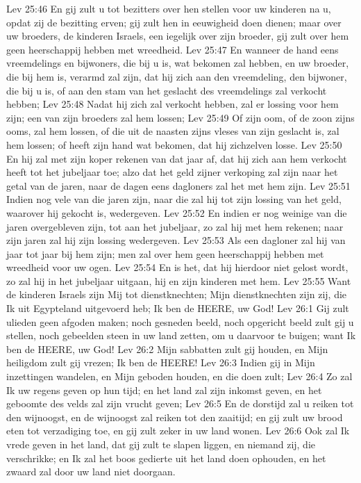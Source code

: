 Lev 25:46  En gij zult u tot bezitters over hen stellen voor uw kinderen na u, opdat zij de bezitting erven; gij zult hen in eeuwigheid doen dienen; maar over uw broeders, de kinderen Israels, een iegelijk over zijn broeder, gij zult over hem geen heerschappij hebben met wreedheid.
Lev 25:47  En wanneer de hand eens vreemdelings en bijwoners, die bij u is, wat bekomen zal hebben, en uw broeder, die bij hem is, verarmd zal zijn, dat hij zich aan den vreemdeling, den bijwoner, die bij u is, of aan den stam van het geslacht des vreemdelings zal verkocht hebben;
Lev 25:48  Nadat hij zich zal verkocht hebben, zal er lossing voor hem zijn; een van zijn broeders zal hem lossen;
Lev 25:49  Of zijn oom, of de zoon zijns ooms, zal hem lossen, of die uit de naasten zijns vleses van zijn geslacht is, zal hem lossen; of heeft zijn hand wat bekomen, dat hij zichzelven losse.
Lev 25:50  En hij zal met zijn koper rekenen van dat jaar af, dat hij zich aan hem verkocht heeft tot het jubeljaar toe; alzo dat het geld zijner verkoping zal zijn naar het getal van de jaren, naar de dagen eens dagloners zal het met hem zijn.
Lev 25:51  Indien nog vele van die jaren zijn, naar die zal hij tot zijn lossing van het geld, waarover hij gekocht is, wedergeven.
Lev 25:52  En indien er nog weinige van die jaren overgebleven zijn, tot aan het jubeljaar, zo zal hij met hem rekenen; naar zijn jaren zal hij zijn lossing wedergeven.
Lev 25:53  Als een dagloner zal hij van jaar tot jaar bij hem zijn; men zal over hem geen heerschappij hebben met wreedheid voor uw ogen.
Lev 25:54  En is het, dat hij hierdoor niet gelost wordt, zo zal hij in het jubeljaar uitgaan, hij en zijn kinderen met hem.
Lev 25:55  Want de kinderen Israels zijn Mij tot dienstknechten; Mijn dienstknechten zijn zij, die Ik uit Egypteland uitgevoerd heb; Ik ben de HEERE, uw God!
Lev 26:1  Gij zult ulieden geen afgoden maken; noch gesneden beeld, noch opgericht beeld zult gij u stellen, noch gebeelden steen in uw land zetten, om u daarvoor te buigen; want Ik ben de HEERE, uw God!
Lev 26:2  Mijn sabbatten zult gij houden, en Mijn heiligdom zult gij vrezen; Ik ben de HEERE!
Lev 26:3  Indien gij in Mijn inzettingen wandelen, en Mijn geboden houden, en die doen zult;
Lev 26:4  Zo zal Ik uw regens geven op hun tijd; en het land zal zijn inkomst geven, en het geboomte des velds zal zijn vrucht geven;
Lev 26:5  En de dorstijd zal u reiken tot den wijnoogst, en de wijnoogst zal reiken tot den zaaitijd; en gij zult uw brood eten tot verzadiging toe, en gij zult zeker in uw land wonen.
Lev 26:6  Ook zal Ik vrede geven in het land, dat gij zult te slapen liggen, en niemand zij, die verschrikke; en Ik zal het boos gedierte uit het land doen ophouden, en het zwaard zal door uw land niet doorgaan.
